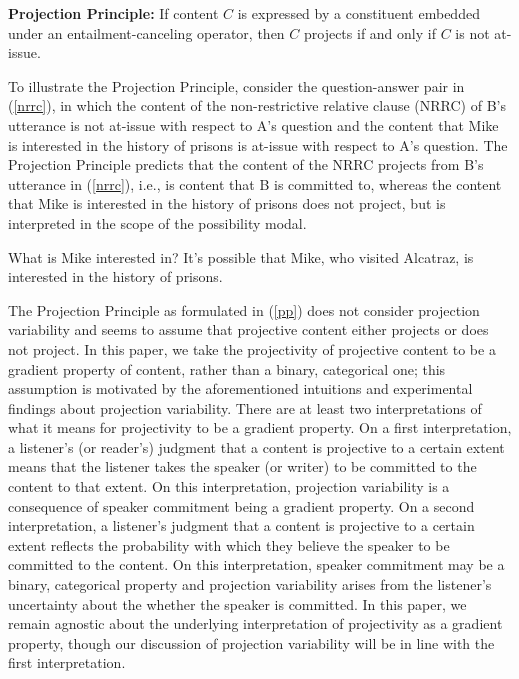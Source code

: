 \documentclass[11pt,fleqn]{article}
\newcommand{\6}{\mbox{$[\hspace*{-.6mm}[$}}
\newcommand{\9}{\mbox{$]\hspace*{-.6mm}]$}}
\def\infelic{{\leavevmode\llap{\#}}}
\begin{document}
\begin{exe}
\ex\label{pp} {\bf Projection Principle:} If content $C$ is expressed by a constituent embedded under an entailment-canceling operator, then $C$ projects if and only if $C$ is not at-issue.

\end{exe} 
To illustrate the Projection Principle, consider the question-answer pair in (\ref{nrrc}), in which the content of the non-restrictive relative clause (NRRC) of B's utterance is not at-issue with respect to A's question and the content that Mike is interested in the history of prisons is at-issue with respect to A's question. The Projection Principle predicts that the content of the NRRC projects from B's utterance in (\ref{nrrc}), i.e., is content that B is committed to, whereas the content that Mike is interested in the history of prisons does not project, but is interpreted in the scope of the possibility modal.

\begin{exe}
\ex\label{nrrc}
\begin{xlist}
 What is Mike interested in?
 It's possible that Mike, who visited Alcatraz, is interested in the history of prisons.
\end{xlist}


\end{exe}
The Projection Principle as formulated in (\ref{pp}) does not consider projection variability and seems to assume that projective content either projects or does not project. In this paper, we take the projectivity of projective content to be a gradient property of content, rather than a binary, categorical one; this assumption is motivated by the aforementioned intuitions and experimental findings about projection variability. There are at least two interpretations of what it means for projectivity to be a gradient property. On a first interpretation, a listener's (or reader's) judgment that a content is projective to a certain extent means that the listener takes the speaker (or writer) to be committed to the content to that extent. On this interpretation, projection variability is a consequence of speaker commitment being a gradient property. On a second interpretation, a listener's judgment that a content is projective to a certain extent reflects the probability with which they believe the speaker to be committed to the content. On this interpretation, speaker commitment may be a binary, categorical property and projection variability arises from the listener's uncertainty about the whether the speaker is committed. In this paper, we remain agnostic about the underlying interpretation of projectivity as a gradient property, though our discussion of projection variability will be in line with the first interpretation.
\end{document}
